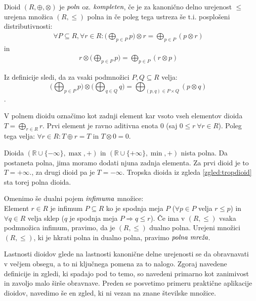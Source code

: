 \documentclass[mat1]{fmfdelo}
\newcommand{\R}{\mathbb{R}}
\newcommand{\pojem}[1]{\ensuremath{\emph{#1}}}
\begin{document}
\begin{definicija}
	Dioid $(R, \oplus,\otimes)$ je \pojem{poln} oz. \pojem{kompleten}, če je za kanonično delno urejenost $\leq$ urejena množica $(R, \leq)$ polna in če poleg tega ustreza še t.i. posplošeni distributivnosti: \begin{align*}
		\forall P \subseteq R, \forall r \in R: \big(\bigoplus_{p\in P}p\big) \otimes r = \bigoplus_{p\in P} \left(p \otimes r\right)
	\end{align*}
in
\begin{align*}
	r \otimes \big( \bigoplus_{p\in P} p \big) = \bigoplus_{p \in P} \left( r \otimes p \right)
\end{align*}
\end{definicija}

Iz definicije sledi, da za vsaki podmnožici $P, Q \subseteq R$ velja: $$\big( \bigoplus_{p\in P} p \big) \otimes \big( \bigoplus_{q\in Q} q \big) = \bigoplus_{(p, q) \in P\times Q} (p \otimes q)$$.

V polnem dioidu označimo kot zadnji element kar vsoto vseh elementov dioida $T = \bigoplus_{r \in R} r$. Prvi element je ravno aditivna enota $0$ (saj $0\leq r~\forall r\in R$). Poleg tega velja: $\forall r\in R: T \oplus r = T$ in $T \otimes 0 = 0$.

\begin{zgled}
	Dioida $(\R\cup \{-\infty\}, \max, +)$ in $(\R\cup \{+\infty\}, \min, +)$ nista polna. Da postaneta polna, jima moramo dodati njuna zadnja elementa. Za prvi dioid je to $T = +\infty$., za drugi dioid pa je $T = -\infty$. Tropska dioida iz zgleda \ref{zgled:tropdioid} sta torej polna dioida.
\end{zgled}

\begin{opomba}
	Omenimo še dualni pojem \pojem{infimuma} množice:\\
	Element $r\in R$ je infimum $P\subseteq R$ ko je spodnja meja $P$ ($\forall p \in P$ velja $ r \leq p$) in $\forall q \in R$ velja sklep ($q$ je spodnja meja $P \Rightarrow q \leq r$). Če ima v $(R, \leq)$ vsaka podmnožica infimum, pravimo, da je $(R, \leq)$ dualno polna. Urejeni množici $(R, \leq)$, ki je hkrati polna in dualno polna, pravimo \pojem{polna mreža}.
\end{opomba}

Lastnosti dioidov glede na lastnosti kanonične delne urejenosti se da obravnavati v večjem obsegu, a to ni ključnega pomena za to nalogo. Zgoraj navedene definicije in zgledi, ki spadajo pod to temo, so navedeni primarno kot zanimivost in zavoljo malo širše obravnave. Preden se posvetimo primeru praktične aplikacije dioidov, navedimo še en zgled, ki ni vezan na znane številske množice.
\end{document}
